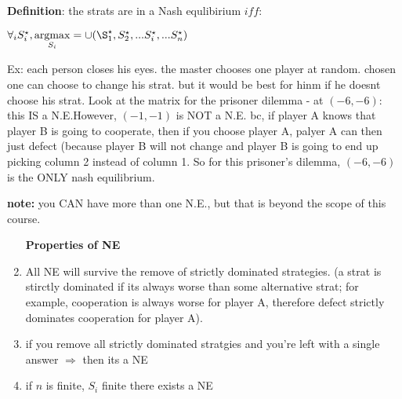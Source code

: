 \documentclass[12pt]{article}
\begin{document}
\textbf{Definition}: the strats are in a Nash equlibirium $iff$: 

$\forall_i S_i^{\star} ,  \underset{S_i}{\operatorname{argmax}} = \cup ( \S_1^{\star}, S_2^{\star}, ... S_i^{\star}, ... S_n^{\star} )$ 

Ex: each person closes his eyes. the master chooses one player at random. chosen one can choose to change his strat. but it would be best for hinm if he doesnt choose his strat. Look at the matrix for the prisoner dilemma - at $(-6,-6)$: this IS a N.E.However, $(-1,-1)$ is NOT a N.E. bc, if player A knows that player B is going to cooperate, then if you choose player A, palyer A can then just defect (because player B will not change and player B is going to end up picking column 2 instead of column 1.  So for this prisoner's dilemma, $(-6,-6)$ is the ONLY nash equilibrium. 

\textbf{note:} you CAN have more than one N.E., but that is beyond the scope of this course. 


\begin{enumerate}
\item [\textbf{Properties of NE}]
\item All NE will survive the remove of strictly dominated strategies. (a strat is stirctly dominated if its always worse than some alternative strat; for example, cooperation is always worse for player A, therefore defect strictly dominates cooperation for player A). 
\item if you remove all strictly dominated stratgies and you're left with a single answer $\Rightarrow$ then its a NE
\item if $n$ is finite, $S_i$ finite there exists a NE
\end{enumerate}
\end{document}
